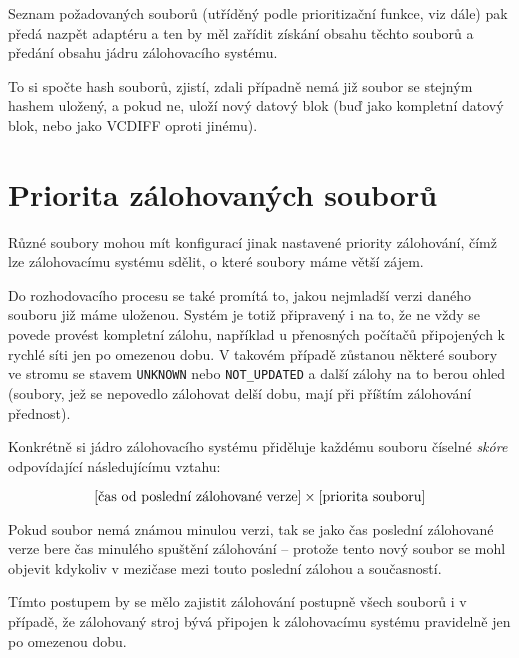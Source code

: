 Seznam požadovaných souborů (utříděný podle prioritizační funkce, viz dále) pak
předá nazpět adaptéru a ten by měl zařídit získání obsahu těchto souborů a
předání obsahu jádru zálohovacího systému.

To si spočte hash souborů, zjistí, zdali případně nemá již soubor se stejným
hashem uložený, a pokud ne, uloží nový datový blok (buď jako kompletní datový
blok, nebo jako \gls{VCDIFF} oproti jinému).

\section{Priorita zálohovaných souborů}

Různé soubory mohou mít konfigurací jinak nastavené priority zálohování, čímž
lze zálohovacímu systému sdělit, o které soubory máme větší zájem.

Do rozhodovacího procesu se také promítá to, jakou nejmladší verzi daného
souboru již máme uloženou. Systém je totiž připravený i na to, že ne vždy se
povede provést kompletní zálohu, například u přenosných počítačů připojených k
rychlé síti jen po omezenou dobu. V takovém případě zůstanou některé soubory ve
stromu se stavem \texttt{UNKNOWN} nebo \texttt{NOT\_UPDATED} a další zálohy na
to berou ohled (soubory, jež se nepovedlo zálohovat delší dobu, mají při příštím
zálohování přednost).

Konkrétně si jádro zálohovacího systému přiděluje každému souboru číselné
{\it skóre} odpovídající následujícímu vztahu:

$$[\hbox{čas od poslední zálohované verze}]\times[\hbox{priorita souboru}]$$

Pokud soubor nemá známou minulou verzi, tak se jako čas poslední zálohované
verze bere čas minulého spuštění zálohování -- protože tento nový soubor se mohl
objevit kdykoliv v mezičase mezi touto poslední zálohou a současností.

Tímto postupem by se mělo zajistit zálohování postupně všech souborů i v případě,
že zálohovaný stroj bývá připojen k zálohovacímu systému pravidelně jen po
omezenou dobu.
